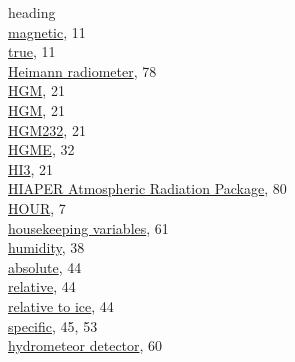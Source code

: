 \documentclass[
  english,
]{book}
\begin{document}
heading\\
\hspace*{0.333em}\hspace*{0.333em}\href{./3-the-state-of-the-aircraft.html\#thdg}{magnetic},
11\\
\hspace*{0.333em}\hspace*{0.333em}\href{./3-the-state-of-the-aircraft.html\#thdg}{true},
11\\
\href{./8-radiation-variables.html\#rstx}{Heimann radiometer}, 78\\
\href{./3-the-state-of-the-aircraft.html\#hgm}{HGM}, 21\\
\href{./3-the-state-of-the-aircraft.html\#hgme-159}{HGM}, 21\\
\href{./3-the-state-of-the-aircraft.html\#hgm-232}{HGM232}, 21\\
\href{./3-the-state-of-the-aircraft.html\#hgme-159}{HGME}, 32\\
\href{./3-the-state-of-the-aircraft.html\#hi3}{HI3}, 21\\
\href{./7-aerosol-particle-measurements.html\#harp}{HIAPER Atmospheric
Radiation Package}, 80\\
\href{./2-general-information-about-data-files.html\#hms\%7C}{HOUR}, 7\\
\href{./5-cloud-physics-variables.html\#sensors-1-D-probes}{housekeeping
variables}, 61\\
\href{./4-the-state-of-the-atmosphere.html\#humidity}{humidity}, 38\\
\hspace*{0.333em}\hspace*{0.333em}\href{./4-the-state-of-the-atmosphere.html\#rho}{absolute},
44\\
\hspace*{0.333em}\hspace*{0.333em}\href{./4-the-state-of-the-atmosphere.html\#rhumw}{relative},
44\\
\hspace*{0.333em}\hspace*{0.333em}\href{./4-the-state-of-the-atmosphere.html\#rhumi}{relative
to ice}, 44\\
\hspace*{0.333em}\hspace*{0.333em}\href{./4-the-state-of-the-atmosphere.html\#sphum}{specific},
45, 53\\
\href{./5-cloud-physics-variables.html\#VariableNames1DProbes}{hydrometeor
detector}, 60\\
\end{document}
